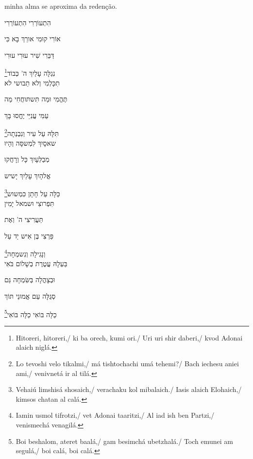 minha alma se aproxima da redenção.\\[10pt]


\movetoevenpage
\raggedleft %

\vspace*{1cm}

הִתְעוֹרְרִי הִתְעוֹרְרִי

אוֹרִי קוּמִי אורֵךְ בָא כִּי

דַּבֵּרִי שִׁיר עוּרִי עוּרִי

\footnote{Hitoreri, hitoreri,/ ki ba orech, kumi ori./ Uri uri shir daberi,/ kvod Adonai alaich niglá.}נִגְלָּה עָלַיִךְ ה' כְּבוֹד\\[10pt]

תִכָּלְמִי וְלא תֵבושי לא 

תֶּהֱמִי וּמַה תִּשתּוחֲחִי מַה

עַמִּי עֲנִיֵּי יֶחֱסוּ בָּךְ

\footnote{Lo tevoshi velo tikalmi,/ má tishtochachi umá tehemi?/ Bach iechesu aniei ami,/ venivnetá ir al tilá.}תִּלָּהּ עַל עִיר וְנִבְנְתָה\\[10pt]

שאסָיִךְ לִמְשסָּה וְהָיוּ

מְבַלְּעָיִךְ כָּל וְרָחֲקוּ

אֱלהָיִךְ עָלַיִךְ יָשיש

\footnote{Vehaiú limshisá shosaich,/ verachaku kol mibalaich./ Iasis alaich Elohaich,/ kimsos chatan al calá.}כַּלָּה עַל חָתָן כִּמְשוש\\[10pt]

תִּפְרוצִי וּשמאל יָמִין

תַּעֲרִיצִי ה' וְאֶת

פַּרְצִי בֶּן אִיש יַד עַל 

\footnote{Iamin usmol tifrotzi,/ vet Adonai taaritzi,/ Al iad ish ben Partzi,/ venismechá venagilá.}וְנָגִילָה וְנִשמְחָה\\[10pt]


בַּעְלָהּ עֲטֶרֶת בְשָׁלוֹם בֹּאִי

וּבְצָהֳלָה בְּשִּׂמְחָה גַּם 

סְגֻלָּה עַם אֱמוּנֵי תּוֹךְ 

\footnote{Boi beshalom, ateret baalá,/ gam besimchá ubetzhalá./ Toch emunei am segulá,/ boi calá, boi calá.}כַלָּה בּוֹאִי כַלָּה בּוֹאִי

\movetooddpage
\raggedright %

\vspace*{1cm}

